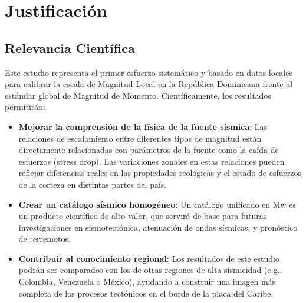 \documentclass[12pt,a4paper]{article}
\begin{document}
\section{Justificación}
\subsection{Relevancia Científica}
Este estudio representa el primer esfuerzo sistemático y basado en datos locales para calibrar la escala de Magnitud Local en la República Dominicana frente al estándar global de Magnitud de Momento. Científicamente, los resultados permitirán:
\begin{itemize}
    \item \textbf{Mejorar la comprensión de la física de la fuente sísmica}: Las relaciones de escalamiento entre diferentes tipos de magnitud están directamente relacionadas con parámetros de la fuente como la caída de esfuerzos (stress drop). Las variaciones zonales en estas relaciones pueden reflejar diferencias reales en las propiedades reológicas y el estado de esfuerzos de la corteza en distintas partes del país.
    \item \textbf{Crear un catálogo sísmico homogéneo}: Un catálogo unificado en Mw es un producto científico de alto valor, que servirá de base para futuras investigaciones en sismotectónica, atenuación de ondas sísmicas, y pronóstico de terremotos.
    \item \textbf{Contribuir al conocimiento regional}: Los resultados de este estudio podrán ser comparados con los de otras regiones de alta sismicidad (e.g., Colombia, Venezuela o México), ayudando a construir una imagen más completa de los procesos tectónicos en el borde de la placa del Caribe.
\end{itemize}
\end{document}
